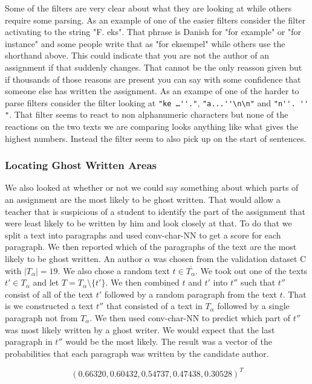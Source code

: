Some of the filters are very clear about what they are looking at while others
require some parsing. As an example of one of the easier filters consider
the filter activating to the string "F. eks". That phrase is Danish for "for
example" or "for instance" and some people write that as "for eksempel" while
others use the shorthand above. This could indicate that you are not the author
of an assignment if that suddenly changes. That cannot be the only reasson
given but if thousands of those reasons are present you can say with some
confidence that someone else has written the assignment. As an exampe of one
of the harder to parse filters consider the filter looking at 
\verb["ke …''."[, \verb["a...''\n\n"[ and \verb["n''. '' "[. That filter seems to react to
non alphanumeric characters but none of the reactions on the two texts we are
comparing looks anything like what gives the highest numbers. Instead the filter
seem to also pick up on the start of sentences.


\subsubsection{Locating Ghost Written Areas}

We also looked at whether or not we could say something about which parts of an
assignment are the most likely to be ghost written. That would allow a teacher
that is suspicious of a student to identify the part of the assignment that
were least likely to be written by him and look closely at that. To do that
we split a text into paragraphs and used \gls{conv-char-NN} to get a score
for each paragraph. We then reported which of the paragraphs of the text are
the most likely to be ghost written. An author $\alpha$ was chosen from the
validation dataset C with $|T_\alpha| = 19$. We also chose a random text $t \in
\overline{T_\alpha}$. We took out one of the texts $t' \in T_\alpha$ and let
$T = T_\alpha \setminus \{t'\}$. We then combined $t$ and $t'$ into $t''$ such
that $t''$ consist of all of the text $t'$ followed by a random paragraph from
the text $t$. That is we constructed a text $t''$ that consisted of a text in
$T_\alpha$ followed by a single paragraph not from $T_\alpha$. We then used
\gls{conv-char-NN} to predict which part of $t''$ was most likely written by a
ghost writer. We would expect that the last paragraph in $t''$ would be the most
likely. The result was a vector of the probabilities that each paragraph was
written by the candidate author.

\begin{equation}
    (0.66320, 0.60432, 0.54737, 0.47438, 0.30528)^T
\end{equation}

